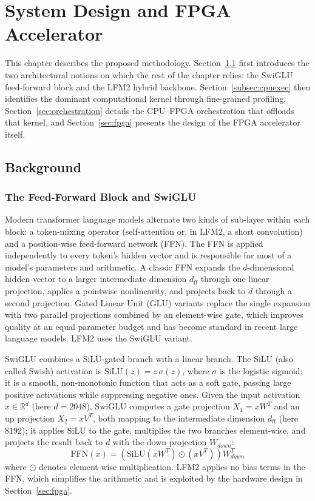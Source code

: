 \chapter{System Design and FPGA Accelerator}
\label{cha:design}

This chapter describes the proposed methodology. Section~\ref{sec:background} first
introduces the two architectural notions on which the rest of the chapter relies: the
SwiGLU feed-forward block and the LFM2 hybrid backbone. Section~\ref{subsec:cpuexec}
then identifies the dominant computational kernel through fine-grained profiling,
Section~\ref{sec:orchestration} details the CPU--FPGA orchestration that offloads that
kernel, and Section~\ref{sec:fpga} presents the design of the FPGA accelerator itself.

\section{Background}
\label{sec:background}

\subsection{The Feed-Forward Block and SwiGLU}
\label{subsec:swiglu_bg}
Modern transformer language models alternate two kinds of sub-layer within each block:
a token-mixing operator (self-attention or, in LFM2, a short convolution) and a
position-wise feed-forward network (FFN). The FFN is applied independently to every
token's hidden vector and is responsible for most of a model's parameters and
arithmetic. A classic FFN expands the $d$-dimensional hidden vector to a larger
intermediate dimension $d_{\text{ff}}$ through one linear projection, applies a
pointwise nonlinearity, and projects back to $d$ through a second projection. Gated
Linear Unit (GLU) variants replace the single expansion with two parallel projections
combined by an element-wise gate, which improves quality at an equal parameter budget
and has become standard in recent large language models. LFM2 uses the SwiGLU variant.

SwiGLU combines a SiLU-gated branch with a linear branch. The SiLU (also called Swish)
activation is $\text{SiLU}(z) = z\,\sigma(z)$, where $\sigma$ is the logistic sigmoid;
it is a smooth, non-monotonic function that acts as a soft gate, passing large positive
activations while suppressing negative ones. Given the input activation $x \in
\mathbb{R}^{d}$ (here $d = 2048$), SwiGLU computes a gate projection $X_1 = x W^{T}$ and
an up projection $X_2 = x V^{T}$, both mapping to the intermediate dimension
$d_{\text{ff}}$ (here $8192$); it applies SiLU to the gate, multiplies the two branches
element-wise, and projects the result back to $d$ with the down projection $W_{down}$:
\begin{equation}
\text{FFN}(x) = (\text{SiLU}(x W^{T}) \odot (x V^{T})) W_{down}^{T}
\label{eq:ffn}
\end{equation}
where $\odot$ denotes element-wise multiplication. LFM2 applies no bias terms in the
FFN, which simplifies the arithmetic and is exploited by the hardware design in
Section~\ref{sec:fpga}.

